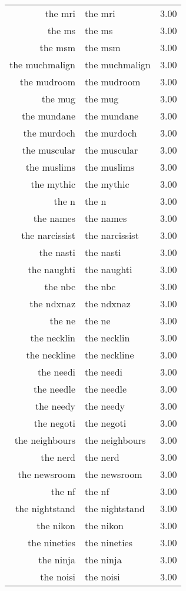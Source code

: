 \begin{table}[ht]
\begin{tabular}{rlr}
  the mri & the mri & 3.00 \\ 
  the ms & the ms & 3.00 \\ 
  the msm & the msm & 3.00 \\ 
  the muchmalign & the muchmalign & 3.00 \\ 
  the mudroom & the mudroom & 3.00 \\ 
  the mug & the mug & 3.00 \\ 
  the mundane & the mundane & 3.00 \\ 
  the murdoch & the murdoch & 3.00 \\ 
  the muscular & the muscular & 3.00 \\ 
  the muslims & the muslims & 3.00 \\ 
  the mythic & the mythic & 3.00 \\ 
  the n & the n & 3.00 \\ 
  the names & the names & 3.00 \\ 
  the narcissist & the narcissist & 3.00 \\ 
  the nasti & the nasti & 3.00 \\ 
  the naughti & the naughti & 3.00 \\ 
  the nbc & the nbc & 3.00 \\ 
  the ndxnaz & the ndxnaz & 3.00 \\ 
  the ne & the ne & 3.00 \\ 
  the necklin & the necklin & 3.00 \\ 
  the neckline & the neckline & 3.00 \\ 
  the needi & the needi & 3.00 \\ 
  the needle & the needle & 3.00 \\ 
  the needy & the needy & 3.00 \\ 
  the negoti & the negoti & 3.00 \\ 
  the neighbours & the neighbours & 3.00 \\ 
  the nerd & the nerd & 3.00 \\ 
  the newsroom & the newsroom & 3.00 \\ 
  the nf & the nf & 3.00 \\ 
  the nightstand & the nightstand & 3.00 \\ 
  the nikon & the nikon & 3.00 \\ 
  the nineties & the nineties & 3.00 \\ 
  the ninja & the ninja & 3.00 \\ 
  the noisi & the noisi & 3.00 \\ 

\end{tabular}
\end{table}
